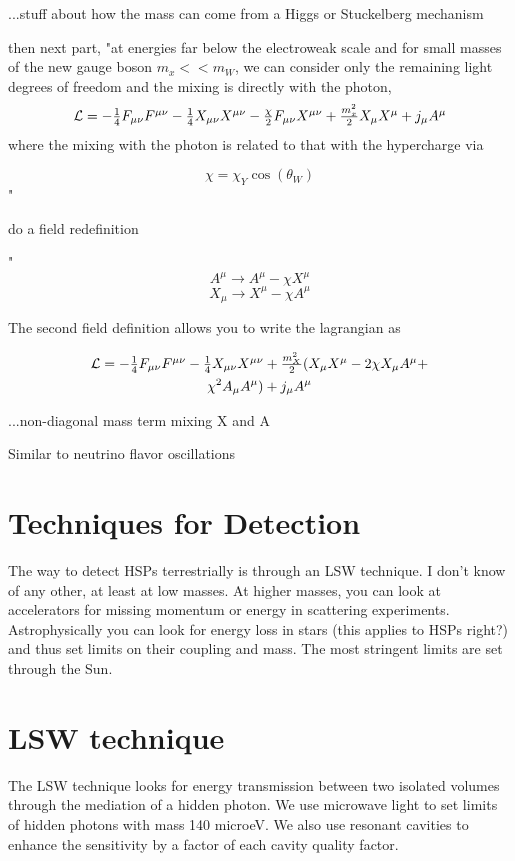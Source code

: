 \documentclass[11pt]{book}
\begin{document}
...stuff about how the mass can come from a Higgs or Stuckelberg mechanism

then next part, "at energies far below the electroweak scale and for small masses of the new gauge boson $m_x << m_W$, we can consider only the remaining light degrees of freedom and the mixing is directly with the photon,
\begin{multline}
$$\mathcal{L} = -\frac{1}{4}F_{\mu\nu}F^{\mu\nu} - \frac{1}{4}X_{\mu\nu}X^{\mu\nu} - \frac{\chi}{2}F_{\mu\nu}X^{\mu\nu}+\frac{m_x^2}{2}X_{\mu}X^{\mu}+j_{\mu}A^{\mu}$$ 
\end{multline}
where the mixing with the photon is related to that with the hypercharge via

$$\chi = \chi_Y \cos(\theta_W)$$"

do a field redefinition

"$$A^{\mu} \rightarrow A^{\mu} - \chi X^{\mu}$$
$$X_{\mu} \rightarrow X^{\mu}-\chi A^{\mu}$$

The second field definition allows you to write the lagrangian as

\begin{multline}
$$\mathcal{L} = -\frac{1}{4}F_{\mu\nu}F^{\mu\nu}-\frac{1}{4}X_{\mu\nu}X^{\mu\nu} +\frac{m_X^2}{2}(X_{\mu}X^{\mu}-2\chi X_{\mu}A^{\mu}+\\ \chi^2 A_{\mu}A^{\mu}) + j_{\mu}A^{\mu}$$
\end{multline}

...non-diagonal mass term mixing X and A

Similar to neutrino flavor oscillations

\section{Techniques for Detection}

The way to detect HSPs terrestrially is through an LSW technique. I don’t know of any other, at least at low masses. At higher masses, you can look at accelerators for missing momentum or energy in scattering experiments. Astrophysically you can look for energy loss in stars (this applies to HSPs right?) and thus set limits on their coupling and mass. The most stringent limits are set through the Sun.

\section{LSW technique}

The LSW technique looks for energy transmission between two isolated volumes through the mediation of a hidden photon. We use microwave light to set limits of hidden photons with mass 140 microeV. We also use resonant cavities to enhance the sensitivity by a factor of each cavity quality factor.
\end{document}
